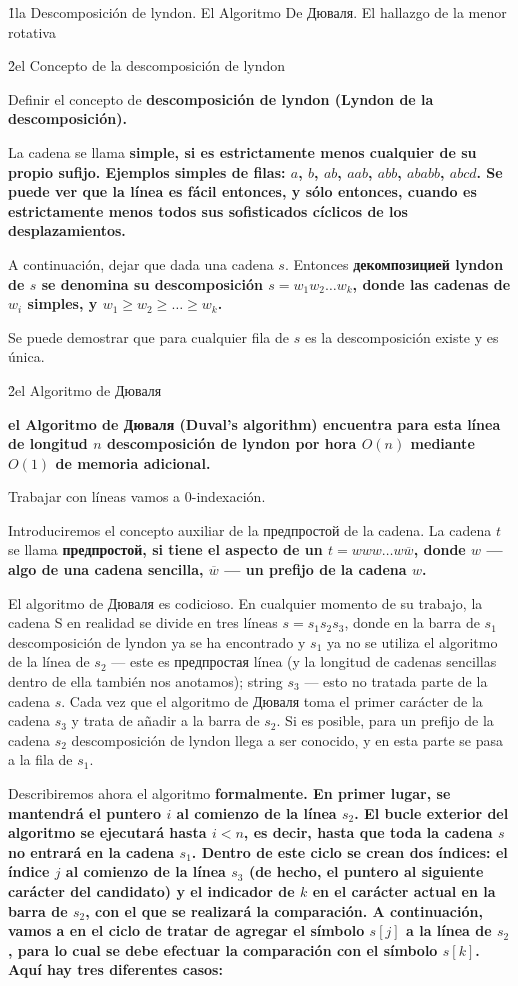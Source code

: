 \h1{la Descomposición de lyndon. El Algoritmo De Дюваля. El hallazgo de la menor rotativa}


\h2{el Concepto de la descomposición de lyndon}

Definir el concepto de \bf{descomposición de lyndon} (Lyndon de la descomposición).

La cadena se llama \bf{simple}, si es estrictamente \bf{menos} cualquier de su propio \bf{sufijo}. Ejemplos simples de filas: $a$, $b$, $ab$, $aab$, $abb$, $ababb$, $abcd$. Se puede ver que la línea es fácil entonces, y sólo entonces, cuando es estrictamente \bf{menos} todos sus sofisticados \bf{cíclicos de los desplazamientos}.

A continuación, dejar que dada una cadena $s$. Entonces \bf{декомпозицией lyndon} de $s$ se denomina su descomposición $s = w_1 w_2 \ldots w_k$, donde las cadenas de $w_i$ simples, y $w_1 \ge w_2 \ge \ldots \ge w_k$.

Se puede demostrar que para cualquier fila de $s$ es la descomposición existe y es única.


\h2{el Algoritmo de Дюваля}

\bf{el Algoritmo de Дюваля} (Duval's algorithm) encuentra para esta línea de longitud $n$ descomposición de lyndon por hora $O (n)$ mediante $O (1)$ de memoria adicional.

Trabajar con líneas vamos a 0-indexación.

Introduciremos el concepto auxiliar de la предпростой de la cadena. La cadena $t$ se llama \bf{предпростой}, si tiene el aspecto de un $t = w w w \ldots w \overline{w}$, donde $w$ --- algo de una cadena sencilla, $\overline{w}$ --- un prefijo de la cadena $w$.

El algoritmo de Дюваля es codicioso. En cualquier momento de su trabajo, la cadena S en realidad se divide en tres líneas $s = s_1 s_2 s_3$, donde en la barra de $s_1$ descomposición de lyndon ya se ha encontrado y $s_1$ ya no se utiliza el algoritmo de la línea de $s_2$ --- este es предпростая línea (y la longitud de cadenas sencillas dentro de ella también nos anotamos); string $s_3$ --- esto no tratada parte de la cadena $s$. Cada vez que el algoritmo de Дюваля toma el primer carácter de la cadena $s_3$ y trata de añadir a la barra de $s_2$. Si es posible, para un prefijo de la cadena $s_2$ descomposición de lyndon llega a ser conocido, y en esta parte se pasa a la fila de $s_1$.

Describiremos ahora el algoritmo \bf{formalmente}. En primer lugar, se mantendrá el puntero $i$ al comienzo de la línea $s_2$. El bucle exterior del algoritmo se ejecutará hasta $i < n$, es decir, hasta que toda la cadena $s$ no entrará en la cadena $s_1$. Dentro de este ciclo se crean dos índices: el índice $j$ al comienzo de la línea $s_3$ (de hecho, el puntero al siguiente carácter del candidato) y el indicador de $k$ en el carácter actual en la barra de $s_2$, con el que se realizará la comparación. A continuación, vamos a en el ciclo de tratar de agregar el símbolo $s[j]$ a la línea de $s_2$, para lo cual se debe efectuar la comparación con el símbolo $s[k]$. Aquí hay tres diferentes casos:

